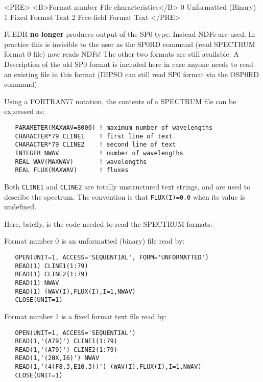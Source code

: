 \begin{htmlonly}
\begin{rawhtml}
<PRE>
<B>Format number   File characteristics</B>
      0         Unformatted (Binary)
      1         Fixed Format Text
      2         Free-field Format Text
</PRE>
\end{rawhtml}
\end{htmlonly}

IUEDR {\bf no longer} produces output of the SP0 type.  Instead NDFs are used.
In practice this is invisible to the user as the  SP0RD
command (read SPECTRUM format 0 file) now reads NDFs!  The other two formats
are still available.  A Description of the old SP0 format is included here in
case anyone needs to read an existing file in this format (DIPSO can still read
SP0 format via the OSP0RD command)\@.

Using a FORTRAN77 notation, the contents of a SPECTRUM file can be
expressed as:

\begin{verbatim}
   PARAMETER(MAXWAV=8000) ! maximum number of wavelengths
   CHARACTER*79 CLINE1    ! first line of text
   CHARACTER*79 CLINE2    ! second line of text
   INTEGER NWAV           ! number of wavelengths
   REAL WAV(MAXWAV)       ! wavelengths
   REAL FLUX(MAXWAV)      ! fluxes
\end{verbatim}

Both \verb+CLINE1+ and \verb+CLINE2+ are totally unstructured text strings,
and are used to describe the spectrum.  The convention is that
\verb+FLUX(I)=0.0+ when its value is undefined.

Here, briefly, is the code needed to read the SPECTRUM formats:

Format number 0 is an unformatted (binary) file read by:

\begin{verbatim}
   OPEN(UNIT=1, ACCESS='SEQUENTIAL', FORM='UNFORMATTED')
   READ(1) CLINE1(1:79)
   READ(1) CLINE2(1:79)
   READ(1) NWAV
   READ(1) (WAV(I),FLUX(I),I=1,NWAV)
   CLOSE(UNIT=1)
\end{verbatim}

Format number 1 is a fixed format text file read by:

\begin{verbatim}
   OPEN(UNIT=1, ACCESS='SEQUENTIAL')
   READ(1,'(A79)') CLINE1(1:79)
   READ(1,'(A79)') CLINE2(1:79)
   READ(1,'(20X,I6)') NWAV
   READ(1,'(4(F8.3,E10.3))') (WAV(I),FLUX(I),I=1,NWAV)
   CLOSE(UNIT=1)
\end{verbatim}

